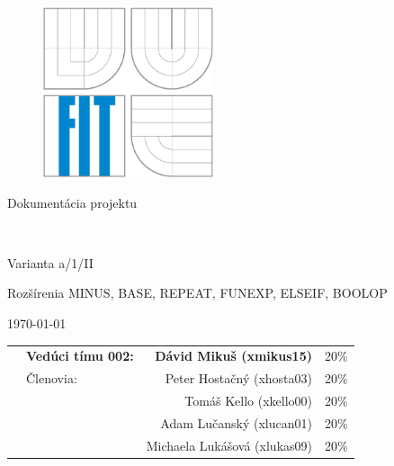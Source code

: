 \begin{titlepage}

\begin{figure}[!h]
  \centering
  \includegraphics[height=5cm]{img/logo.eps}
\end{figure}

\vfill

\begin{center}
\begin{Large}
Dokumentácia projektu\\
\end{Large}

\bigskip

	\begin{Huge}
		\projname\\
	\end{Huge}

	\begin{large}
		Varianta a/1/II\\
		{\small Rozšírenia MINUS, BASE, REPEAT, FUNEXP, ELSEIF, BOOLOP \par}
	\end{large}
\end{center}

\vfill

\begin{center}
\begin{Large}
\today
\end{Large}
\end{center}

\vfill

\begin{flushleft}

	\begin{large}
		\begin{tabularx}{\linewidth}{Xlrl}
		   & \textbf{Vedúci tímu 002:} & \textbf{Dávid Mikuš (xmikus15)} & 20\% \\
		   & Členovia: & Peter Hostačný (xhosta03) & 20\% \\
		   &           & Tomáš Kello (xkello00) & 20\% \\
		   &           & Adam Lučanský (xlucan01) & 20\% \\
		   &           & Michaela Lukášová (xlukas09) & 20\%
		\end{tabularx}
	\end{large}
\end{flushleft}
\end{titlepage}
